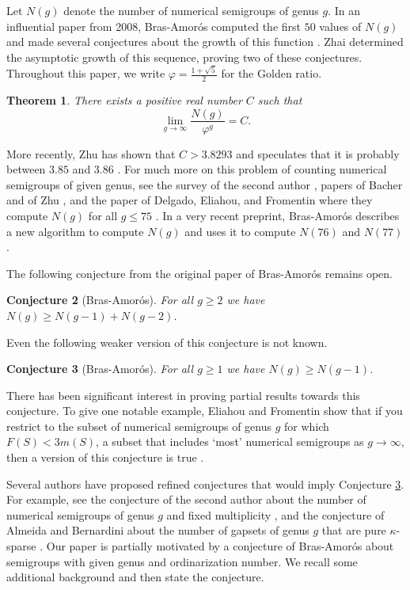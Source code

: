 \documentclass[12pt]{amsart}
\theoremstyle{plain}\newtheorem{proposition}{Proposition}[section]
\newtheorem{conj}[proposition]{Conjecture}
\newtheorem{thm}[proposition]{Theorem}
\begin{document}
Let $N(g)$ denote the number of numerical semigroups of genus $g$.  In an influential paper from 2008, Bras-Amor\'os computed the first $50$ values of $N(g)$ and made several conjectures about the growth of this function \cite{Bras-Amoros_fib}.  Zhai determined the asymptotic growth of this sequence, proving two of these conjectures.  Throughout this paper, we write $\varphi = \frac{1+\sqrt{5}}{2}$ for the Golden ratio.
\begin{thm}\cite[Theorem 1]{Zhai}\label{thm:Zhai}
There exists a positive real number $C$ such that 
\[
\lim_{g \rightarrow \infty} \frac{N(g)}{\varphi^g} = C.
\]
\end{thm}
\noindent More recently, Zhu has shown that $C > 3.8293$ and speculates that it is probably between $3.85$ and $3.86$ \cite[Proposition 7.2]{Zhu}.  For much more on this problem of counting numerical semigroups of given genus, see the survey of the second author \cite{KaplanSurvey}, papers of Bacher \cite{Bacher} and of Zhu \cite{Zhu}, and the paper of Delgado, Eliahou, and Fromentin where they compute $N(g)$ for all $g \le 75$ \cite{DelgadoEliahouFromentin}.  In a very recent preprint, Bras-Amor\'os describes a new algorithm to compute $N(g)$ and uses it to compute $N(76)$ and $N(77)$ \cite{BA_Exploring}.

The following conjecture from the original paper of Bras-Amor\'os remains open.
\begin{conj}[Bras-Amor\'os]\cite{Bras-Amoros_fib}
For all $g \ge 2$ we have $N(g) \ge N(g-1) + N(g-2)$.
\end{conj}
Even the following weaker version of this conjecture is not known.
\begin{conj}[Bras-Amor\'os]\label{Ng_inc}
For all $g \ge 1$ we have $N(g) \ge N(g-1)$.
\end{conj}
There has been significant interest in proving partial results towards this conjecture.  To give one notable example, Eliahou and Fromentin show that if you restrict to the subset of numerical semigroups of genus $g$ for which $F(S) < 3m(S)$, a subset that includes `most' numerical semigroups as $g \rightarrow \infty$, then a version of this conjecture is true \cite{EliahouFromentin}.

Several authors have proposed refined conjectures that would imply Conjecture \ref{Ng_inc}. For example, see the conjecture of the second author about the number of numerical semigroups of genus $g$ and fixed multiplicity \cite[Conjecture 7]{KaplanJPAA}, and the conjecture of Almeida and Bernardini about the number of gapsets of genus $g$ that are pure $\kappa$-sparse \cite[Section 6]{AlmeidaBernardini}.  Our paper is partially motivated by a  conjecture of Bras-Amor\'os about semigroups with given genus and ordinarization number. We recall some additional background and then state the conjecture.
\end{document}
